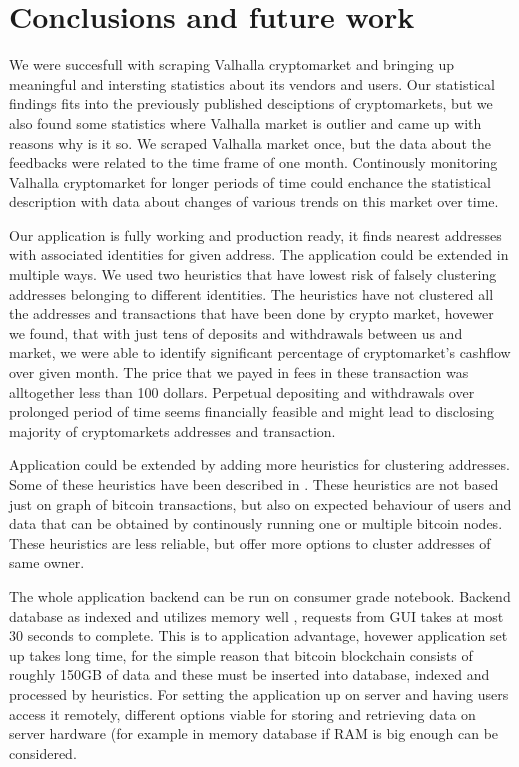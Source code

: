 \documentclass[
  digital, %
  table,   %
  lof,     %
  lot,     %
  oneside
]{fithesis3}
\begin{document}
\chapter{Conclusions and future work}

We were succesfull with scraping Valhalla cryptomarket and
bringing up meaningful and intersting statistics about its vendors and users.
Our statistical findings fits into the previously published desciptions
of cryptomarkets, but we also found some statistics where Valhalla market is outlier and
came up with reasons why is it so.
We scraped Valhalla market once, but the data about the feedbacks were
related to the time frame of one month. Continously monitoring 
Valhalla cryptomarket for longer periods of time could enchance the statistical description
with data about changes of various trends on this market over time.

Our application is fully working and production ready, it 
finds nearest addresses with associated identities for given address.
The application could be extended in multiple ways. We used two
heuristics that have lowest risk of falsely clustering addresses belonging to different identities.
The heuristics have not clustered all the addresses and transactions that have been done by crypto market,
hovewer we found, that with just tens of deposits and withdrawals between us and market,
we were able to identify significant percentage of cryptomarket's cashflow over given month.
The price that we payed in fees in these transaction was alltogether less than 100 dollars. 
Perpetual depositing and withdrawals over prolonged period of time seems financially feasible
and might lead to disclosing majority of cryptomarkets addresses and transaction.

Application could be extended by adding more heuristics for clustering addresses. Some of these
heuristics have been described in \parencite{androulaki2013evaluating}.
These heuristics are not based just on graph of bitcoin transactions, but also
on expected behaviour of users and data that can be obtained by continously running one or multiple
bitcoin nodes. These heuristics are less reliable, but offer more options to cluster addresses of same owner.

The whole application backend can be run on consumer grade notebook. Backend database as indexed and utilizes memory well
, requests from GUI takes at most 30 seconds to complete. This is to application advantage,
hovewer application set up takes long time, for the simple reason that bitcoin
blockchain consists of roughly 150GB of data and these must be inserted into database, indexed
and processed by heuristics.
For setting the application up on server and having users access it remotely,
different options viable for storing and retrieving data on server hardware
(for example in memory database if RAM is big enough can be considered.

\printbibliography{}
\end{document}
